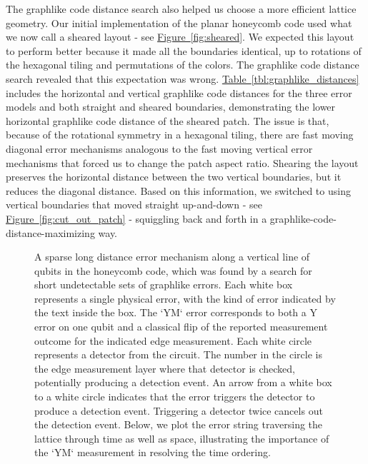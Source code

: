 \documentclass[onecolumn,a4paper,accepted=2022-09-12]{quantumarticle}
\theoremstyle{definition}
\theoremstyle{definition}
\theoremstyle{definition}
\newcommand{\fig}[1]{\hyperref[fig:#1]{Figure~\ref*{fig:#1}}}
\newcommand{\tbl}[1]{\hyperref[tbl:#1]{Table~\ref*{tbl:#1}}}
\begin{document}
The graphlike code distance search also helped us choose a more efficient lattice geometry.
Our initial implementation of the planar honeycomb code used what we now call a sheared layout - see \fig{sheared}.
We expected this layout to perform better because it made all the boundaries identical, up to rotations of the hexagonal tiling and permutations of the colors.
The graphlike code distance search revealed that this expectation was wrong.
\tbl{graphlike_distances} includes the horizontal and vertical graphlike code distances for the three error models and both straight and sheared boundaries, demonstrating the lower horizontal graphlike code distance of the sheared patch.
The issue is that, because of the rotational symmetry in a hexagonal tiling, there are fast moving diagonal error mechanisms analogous to the fast moving vertical error mechanisms that forced us to change the patch aspect ratio.
Shearing the layout preserves the horizontal distance between the two vertical boundaries, but it reduces the diagonal distance.
Based on this information, we switched to using vertical boundaries that moved straight up-and-down - see \fig{cut_out_patch} - squiggling back and forth in a graphlike-code-distance-maximizing way.

\begin{figure}[ht!]
    \centering
    \caption{
    A sparse long distance error mechanism along a vertical line of qubits in the honeycomb code, which was found by a search for short undetectable sets of graphlike errors.
    Each white box represents a single physical error, with the kind of error indicated by the text inside the box.
    The `YM` error corresponds to both a Y error on one qubit and a classical flip of the reported measurement outcome for the indicated edge measurement.
    Each white circle represents a detector from the circuit.
    The number in the circle is the edge measurement layer where that detector is checked, potentially producing a detection event.
    An arrow from a white box to a white circle indicates that the error triggers the detector to produce a detection event.
    Triggering a detector twice cancels out the detection event.  
    Below, we plot the error string traversing the lattice through time as well as space, illustrating the importance of the `YM` measurement in resolving the time ordering.
    }
    \label{fig:bad_error}
\end{figure}
\end{document}
